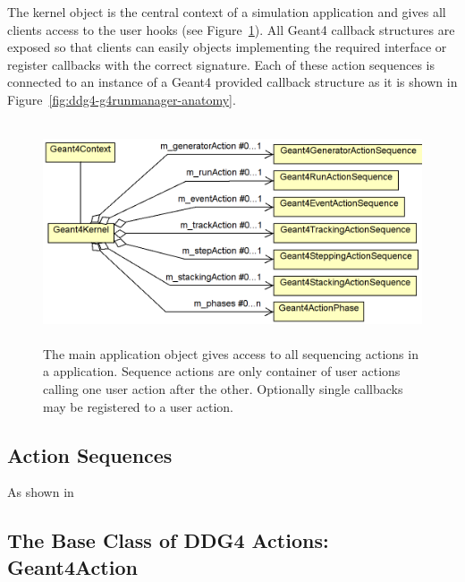 \noindent
The kernel object is the central context of a \DDG simulation application and
gives all clients access to the user hooks (see Figure~\ref{fig:ddg4-geant4-kernel}).
All Geant4 callback structures are exposed so that clients can easily 
objects implementing the required interface or register callbacks with the 
correct signature. Each of these action sequences is connected to an instance
of a Geant4 provided callback structure as it is shown in
Figure~\ref{fig:ddg4-g4runmanager-anatomy}.
\begin{figure}[h]
  \begin{center}
    \includegraphics[height=65mm] {DDG4-Geant4Kernel.png}
    \caption{The main application object gives access to all sequencing actions
    in a  application. Sequence actions are only container of user actions
    calling one user action after the other. Optionally single callbacks may 
    be registered to a user action.}
    \label{fig:ddg4-geant4-kernel}
  \end{center}
\end{figure}

\subsection{Action Sequences}
\label{sec:ddg4-user-manual-implementation-geant4action-sequences}

\noindent
As shown in 

\subsection{The Base Class of DDG4 Actions: Geant4Action}
\label{sec:ddg4-user-manual-implementation-geant4action-base}

